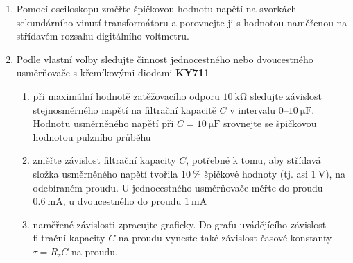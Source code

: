\documentclass[0-protokol.tex]{subfiles}
\begin{document}
\begin{enumerate}
\item Pomocí osciloskopu změřte špičkovou hodnotu napětí na svorkách sekundárního vinutí transformátoru a porovnejte ji s hodnotou naměřenou na střídavém rozsahu digitálního voltmetru.
\item Podle vlastní volby sledujte činnost jednocestného nebo dvoucestného usměrňovače s křemíkovými diodami \textbf{KY711}
\begin{enumerate}
\item při maximální hodnotě zatěžovacího odporu $\SI{10}{\kilo\ohm}$ sledujte závislost stejnosměrného napětí na filtrační kapacitě $C$ v intervalu $0–10 \ \si{\micro\farad}$. Hodnotu usměrněného napětí při $C = \SI{10}{\micro\farad}$ srovnejte se špičkovou hodnotou pulzního průběhu 
\item změřte závislost filtrační kapacity $C$, potřebné k tomu, aby střídavá složka usměrněného napětí tvořila $\SI{10}{\percent}$ špičkové hodnoty (tj. asi $\SI{1}{\volt}$), na odebíraném proudu. U jednocestného usměrňovače měřte do proudu $\SI{0,6}{\milli\ampere}$, u dvoucestného do proudu $\SI{1}{\milli\ampere}$
\item naměřené závislosti zpracujte graficky. Do grafu uvádějícího závislost filtrační kapacity $C$ na proudu vyneste také závislost časové konstanty $\tau = R_zC$ na proudu.
\end{enumerate}

\end{enumerate}
\end{document}
